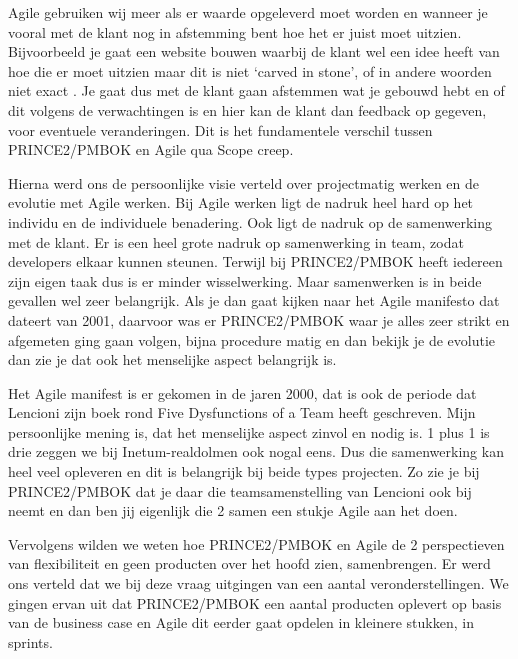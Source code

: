 \documentclass[dutch]{hogent-article}
\begin{document}
Agile gebruiken wij meer als er waarde opgeleverd moet worden  en wanneer je vooral met de klant nog in afstemming bent hoe het er juist moet uitzien. Bijvoorbeeld je gaat een website bouwen waarbij de klant wel een idee heeft van hoe die er moet uitzien maar dit is niet ‘carved in stone’, of in andere woorden niet exact . Je gaat dus met de klant gaan afstemmen wat je gebouwd hebt en of dit volgens de verwachtingen is en hier kan de klant dan feedback op gegeven, voor eventuele veranderingen. Dit is het fundamentele verschil tussen PRINCE2/PMBOK en Agile qua Scope creep. 
\newline

Hierna werd ons de persoonlijke visie verteld over projectmatig werken en de evolutie met Agile werken. Bij Agile werken ligt de nadruk heel hard op het individu en de individuele benadering. Ook ligt de nadruk op de samenwerking met de klant. Er is een heel  grote nadruk op samenwerking in team, zodat developers elkaar kunnen steunen. Terwijl bij PRINCE2/PMBOK heeft iedereen zijn eigen taak dus is er minder wisselwerking. Maar samenwerken is in beide gevallen wel zeer belangrijk. Als je dan gaat kijken naar het Agile manifesto dat dateert van 2001, daarvoor was er PRINCE2/PMBOK waar je alles zeer strikt en afgemeten ging gaan volgen, bijna procedure matig en dan bekijk je de evolutie dan zie je dat ook het menselijke aspect belangrijk is. 
\newline

Het Agile manifest is er gekomen in de jaren 2000, dat is ook de periode dat Lencioni zijn boek rond Five Dysfunctions of a Team heeft geschreven. Mijn persoonlijke mening is, dat het menselijke aspect zinvol en nodig is. 1 plus 1 is drie zeggen we bij Inetum-realdolmen ook nogal eens. Dus die samenwerking kan heel veel opleveren en dit is belangrijk bij beide types projecten. Zo zie je bij PRINCE2/PMBOK dat je daar die teamsamenstelling van Lencioni ook bij neemt en dan ben jij eigenlijk die 2 samen een stukje Agile aan het doen. 
\newline

Vervolgens wilden we weten hoe PRINCE2/PMBOK en Agile de 2 perspectieven van flexibiliteit en geen producten over het hoofd zien, samenbrengen. Er werd ons verteld dat we bij deze vraag uitgingen van een aantal veronderstellingen. We gingen ervan uit dat PRINCE2/PMBOK een aantal producten oplevert op basis van de business case en Agile dit eerder gaat opdelen in kleinere stukken, in sprints. 
\newline
\end{document}

